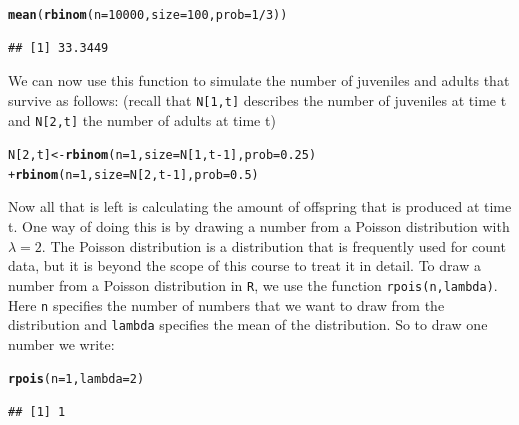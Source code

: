 \documentclass{article}\usepackage[]{graphicx}\usepackage[]{color}
\makeatletter
\newcommand{\hlnum}[1]{\textcolor[rgb]{0.686,0.059,0.569}{#1}}%
\newcommand{\hlopt}[1]{\textcolor[rgb]{0,0,0}{#1}}%
\newcommand{\hlstd}[1]{\textcolor[rgb]{0.345,0.345,0.345}{#1}}%
\newcommand{\hlkwb}[1]{\textcolor[rgb]{0.69,0.353,0.396}{#1}}%
\newcommand{\hlkwc}[1]{\textcolor[rgb]{0.333,0.667,0.333}{#1}}%
\newcommand{\hlkwd}[1]{\textcolor[rgb]{0.737,0.353,0.396}{\textbf{#1}}}%
\newenvironment{kframe}{%
 \def\at@end@of@kframe{}%
 \ifinner\ifhmode%
  \def\at@end@of@kframe{\end{minipage}}%
  \begin{minipage}{\columnwidth}%
 \fi\fi%
 \def\FrameCommand##1{\hskip\@totalleftmargin \hskip-\fboxsep
 \colorbox{shadecolor}{##1}\hskip-\fboxsep
     \hskip-\linewidth \hskip-\@totalleftmargin \hskip\columnwidth}%
 \MakeFramed {\advance\hsize-\width
   \@totalleftmargin\z@ \linewidth\hsize
   \@setminipage}}%
 {\par\unskip\endMakeFramed%
 \at@end@of@kframe}
\newenvironment{knitrout}{}{} %
\makeatother
\begin{document}
\begin{knitrout}
\color{fgcolor}\begin{kframe}
\begin{alltt}
\hlkwd{mean}\hlstd{(}\hlkwd{rbinom}\hlstd{(}\hlkwc{n}\hlstd{=}\hlnum{10000}\hlstd{,}\hlkwc{size}\hlstd{=}\hlnum{100}\hlstd{,}\hlkwc{prob}\hlstd{=}\hlnum{1}\hlopt{/}\hlnum{3}\hlstd{))}
\end{alltt}
\begin{verbatim}
## [1] 33.3449
\end{verbatim}
\end{kframe}
\end{knitrout}
We can now use this function to simulate the number of juveniles and adults that survive as follows:
(recall that \texttt{N[1,t]} describes the number of juveniles at time t and \texttt{N[2,t]} the number of adults at time t)
\begin{knitrout}
\color{fgcolor}\begin{kframe}
\begin{alltt}
\hlstd{N[}\hlnum{2}\hlstd{,t]}\hlkwb{<-}\hlkwd{rbinom}\hlstd{(}\hlkwc{n}\hlstd{=}\hlnum{1}\hlstd{,}\hlkwc{size}\hlstd{=N[}\hlnum{1}\hlstd{,t}\hlopt{-}\hlnum{1}\hlstd{],}\hlkwc{prob}\hlstd{=}\hlnum{0.25}\hlstd{)}
        \hlopt{+} \hlkwd{rbinom}\hlstd{(}\hlkwc{n}\hlstd{=}\hlnum{1}\hlstd{,}\hlkwc{size}\hlstd{=N[}\hlnum{2}\hlstd{,t}\hlopt{-}\hlnum{1}\hlstd{],}\hlkwc{prob}\hlstd{=}\hlnum{0.5}\hlstd{)}
\end{alltt}
\end{kframe}
\end{knitrout}
Now all that is left is calculating the amount of offspring that is produced at time t. One way of doing this is by drawing a number from a Poisson distribution with $\lambda=2$. The Poisson distribution is a distribution that is frequently used for count data, but it is beyond the scope of this course to treat it in detail. To draw a number from a Poisson distribution in \texttt{R}, we use the function \texttt{rpois(n,lambda)}. Here \texttt{n} specifies the number of numbers that we want to draw from the distribution and \texttt{lambda} specifies the mean of the distribution. So to draw one number we write:
\begin{knitrout}
\color{fgcolor}\begin{kframe}
\begin{alltt}
\hlkwd{rpois}\hlstd{(}\hlkwc{n}\hlstd{=}\hlnum{1}\hlstd{,}\hlkwc{lambda}\hlstd{=}\hlnum{2}\hlstd{)}
\end{alltt}
\begin{verbatim}
## [1] 1
\end{verbatim}
\end{kframe}
\end{knitrout}
\end{document}
